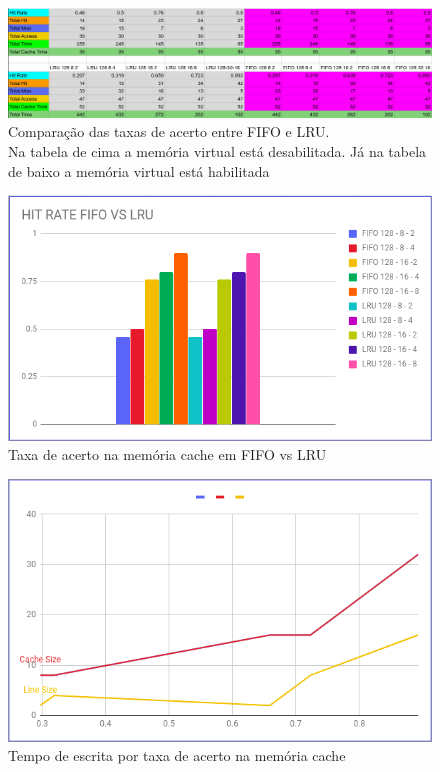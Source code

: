 \documentclass[conference]{IEEEtran}
\begin{document}
\begin{figure}
    \centering
    \includegraphics[width=\linewidth]{Imagens/Tabela.png}
    \caption{Comparação das taxas de acerto entre FIFO e LRU.\\Na tabela de cima a memória virtual está desabilitada. Já na tabela de baixo a memória virtual está habilitada}
    \label{fig:Comparação das taxas de acerto entre FIFO e LRU.\\Na tabela de cima a memória virtual está desabilitada. Já na tabela de baixo a memória virtual está habilitada}
\end{figure}

\begin{figure}
    \centering
    \includegraphics[width=\linewidth]{Imagens/Hit_RATE_FIFO_VS_LRU.png}
    \caption{Taxa de acerto na memória cache em FIFO vs LRU}
    \label{fig:Taxa de acerto na memória cache em FIFO vs LRU}
\end{figure}

\begin{figure}
    \centering
    \includegraphics[width=\linewidth]{Imagens/WRITE_TIME_POR_HIT_RATE.png}
    \caption{Tempo de escrita por taxa de acerto na memória cache}
    \label{fig:Tempo de escrita por taxa de acerto na memória cache}
\end{figure}
\end{document}
